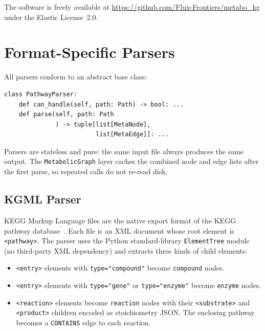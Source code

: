 \documentclass[10pt]{article}
\begin{document}
The software is freely available at
\url{https://github.com/Flux-Frontiers/metabo_kg} under the Elastic License~2.0.

\appendix

\section{Format-Specific Parsers}
\label{sec:parsers-detail}

All parsers conform to an abstract base class:

\begin{lstlisting}[style=python]
class PathwayParser:
    def can_handle(self, path: Path) -> bool: ...
    def parse(self, path: Path
              ) -> tuple[list[MetaNode],
                         list[MetaEdge]]: ...
\end{lstlisting}

Parsers are stateless and pure: the same input file always produces the same
output. The \texttt{MetabolicGraph} layer caches the combined node and edge
lists after the first parse, so repeated calls do not re-read disk.

\subsection{KGML Parser}

KEGG Markup Language files are the native export format of the KEGG pathway
database~\citep{kanehisa2021kegg}. Each file is an XML document whose root
element is \texttt{<pathway>}. The parser uses the Python standard-library
\texttt{ElementTree} module (no third-party XML dependency) and extracts three
kinds of child elements:

\begin{itemize}[leftmargin=*,itemsep=2pt]
  \item \texttt{<entry>} elements with \texttt{type="compound"} become
    \texttt{compound} nodes.
  \item \texttt{<entry>} elements with \texttt{type="gene"} or
    \texttt{type="enzyme"} become \texttt{enzyme} nodes.
  \item \texttt{<reaction>} elements become \texttt{reaction} nodes with
    their \texttt{<substrate>} and \texttt{<product>} children encoded as
    stoichiometry JSON. The enclosing pathway becomes a \texttt{CONTAINS}
    edge to each reaction.
\end{itemize}
\end{document}
